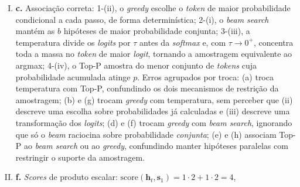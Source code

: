 \documentclass{dlproblemset}
\begin{document}
\begin{enumerate}[I)]
    ($b=2$) são $0.50 \times 0.40 = 0.20$ (via ``céu'') e $0.45 \times 0.90 = 0.405$ (via
    ``sol''). O \textit{beam search} compara as sequências completas e escolhe ``O sol brilha''
    ($0.405 > 0.20$). O \textit{greedy} escolhe o \textit{token} localmente mais provável no
    primeiro passo (``céu'', com $0.50$) e, no segundo passo, a continuação mais provável de
    ``céu'' (``azul'', com $0.40 > 0.35$ de ``limpo''), ficando preso à sequência ``O céu azul''
    e perdendo a melhor global. É exatamente o caso em que \textit{greedy} e \textit{beam}
    divergem. As alternativas (b) e (d) afirmam que ambos escolhem ``céu'', ignorando que o
    \textit{beam} avalia a sequência inteira; (c) afirma coincidência, mas aqui há divergência;
    (a) inverte os papéis (quem maximiza a conjunta é o \textit{beam}, não o \textit{greedy});
    (e) o \textit{score} do \textit{beam} usa a soma dos \emph{log} das probabilidades
    (equivalente ao produto), e não a soma das probabilidades; (f) o \textit{beam} não prioriza
    \textit{tokens} de baixa probabilidade; (h) a penalidade de comprimento só importa ao
    comparar sequências de \emph{tamanhos diferentes}, e aqui ambas têm $2$ \textit{tokens}.
    \item \textbf{c.} Associação correta: 1-(ii), o \textit{greedy} escolhe o \textit{token} de
    maior probabilidade condicional a cada passo, de forma determinística; 2-(i), o \textit{beam
    search} mantém as $b$ hipóteses de maior probabilidade conjunta; 3-(iii), a temperatura divide os \textit{logits} por $\tau$ antes da \textit{softmax} e, com
    $\tau \to 0^{+}$, concentra toda a massa no \textit{token} de maior \textit{logit}, tornando a
    amostragem equivalente ao argmax; 4-(iv), o Top-P amostra
    do menor conjunto de \textit{tokens} cuja probabilidade acumulada atinge $p$. Erros agrupados
    por troca: (a) troca temperatura com Top-P, confundindo os dois mecanismos de restrição da
    amostragem; (b) e (g) trocam \textit{greedy} com temperatura, sem perceber que (ii) descreve
    uma escolha sobre probabilidades já calculadas e (iii) descreve uma transformação dos \textit{logits}; (d) e (f) trocam
    \textit{greedy} com \textit{beam search}, ignorando que só o \textit{beam} raciocina sobre
    probabilidade \emph{conjunta}; (e) e (h) associam Top-P ao \textit{beam search} ou ao
    \textit{greedy}, confundindo manter hipóteses paralelas com restringir o suporte da
    amostragem.
    \item \textbf{f.} \textit{Scores} de produto escalar:
    $\mathrm{score}(\mathbf{h}_t, \mathbf{s}_1) = 1 \cdot 2 + 1 \cdot 2 = 4$,

\end{enumerate}
\end{document}
